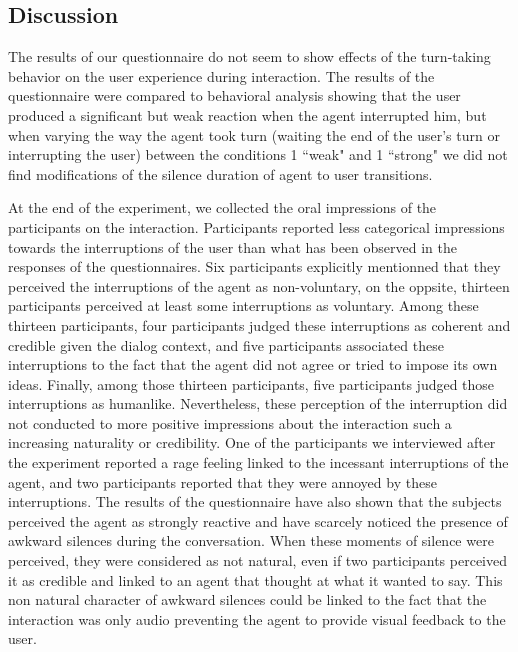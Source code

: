 \subsection{Discussion}

The results of our questionnaire do not seem to show effects of the turn-taking behavior on the user experience during interaction. The results of the questionnaire were compared to behavioral analysis showing that the user produced a significant but weak reaction when the agent interrupted him, but when varying the way the agent took turn (waiting the end of the user's turn or interrupting the user) between the conditions 1 ``weak" and 1 ``strong" we did not find modifications of the silence duration of agent to user transitions. 

At the end of the experiment, we collected the oral impressions of the participants on the interaction. Participants reported less categorical impressions towards the interruptions of the user than what has been observed in the responses of the questionnaires. Six participants explicitly mentionned that they perceived the interruptions of the agent as non-voluntary, on the oppsite, thirteen participants perceived at least some interruptions as voluntary. Among these thirteen participants, four participants judged these interruptions as coherent and credible given the dialog context, and five participants associated these interruptions to the fact that the agent did not agree or tried to impose its own ideas. Finally, among those thirteen participants, five participants judged those interruptions as humanlike. Nevertheless, these perception of the interruption did not conducted to more positive impressions about the interaction such a increasing naturality or credibility. One of the participants we interviewed after the experiment reported a rage feeling linked to the incessant interruptions of the agent, and two participants reported that they were annoyed by these interruptions. The results of the questionnaire have also shown that the subjects perceived the agent as strongly reactive and have scarcely noticed the presence of awkward silences during the conversation. When these moments of silence were perceived, they were considered as not natural, even if two participants perceived it as credible and linked to an agent that thought at what it wanted to say. This non natural character of awkward silences could be linked to the fact that the interaction was only audio preventing the agent to provide visual feedback to the user. 

